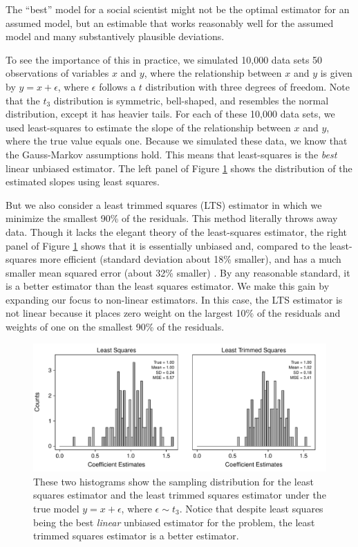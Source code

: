 \documentclass[12pt]{article}
\begin{document}
\noindent The ``best'' model for a social scientist might not be the optimal estimator for an assumed model, but an estimable that works reasonably well for the assumed model and many substantively plausible deviations. 

To see the importance of this in practice, we simulated 10,000 data sets 50 observations of variables $x$ and $y$, where the relationship between $x$ and $y$ is given by $y = x + \epsilon$, where $\epsilon$ follows a $t$ distribution with three degrees of freedom. Note that the $t_3$ distribution is symmetric, bell-shaped, and resembles the normal distribution, except it has heavier tails. For each of these 10,000 data sets, we used least-squares to estimate the slope of the relationship between $x$ and $y$, where the true value equals one. Because we simulated these data, we know that the Gauss-Markov assumptions hold. This means that least-squares is the \textit{best} linear unbiased estimator. The left panel of Figure \ref{fig:lts-illustration} shows the distribution of the estimated slopes using least squares.

But we also consider a least trimmed squares (LTS) estimator in which we minimize the smallest 90\% of the residuals. This method literally throws away data. Though it lacks the elegant theory of the least-squares estimator, the right panel of Figure \ref{fig:lts-illustration} shows that it is essentially unbiased and, compared to the least-squares more efficient (standard deviation about 18\% smaller), and has a much smaller mean squared error (about 32\% smaller) . By any reasonable standard, it is a better estimator than the least squares estimator. We make this gain by expanding our focus to non-linear estimators. In this case, the LTS estimator is not linear because it places zero weight on the largest 10\% of the residuals and weights of one on the smallest 90\% of the residuals.

\begin{figure}[h!]
\begin{center}
\includegraphics[scale = .7]{figs/lts-illustration.pdf}
\caption{These two histograms show the sampling distribution for the least squares estimator and the least trimmed squares estimator under the true model $y = x + \epsilon$, where $\epsilon \sim t_3$. Notice that despite least squares being the best \textit{linear} unbiased estimator for the problem, the least trimmed squares estimator is a better estimator.}\label{fig:lts-illustration}
\end{center}
\end{figure}
\end{document}
